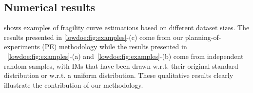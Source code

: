 \subsection{Numerical results}\label{lowdoe:sec:results}

%
 shows examples of fragility curve estimations based on different dataset sizes. 
The results presented in \cref{lowdoe:fig:examples}-(c) come from our planning-of-experiments (PE) methodology while the results presented in ~\ref{lowdoe:fig:examples}-(a) and~\ref{lowdoe:fig:examples}-(b) come from independent random samples, with IMs that have been drawn w.r.t. their original standard distribution or w.r.t. a uniform distribution. These qualitative results clearly illustrate the contribution of our methodology.




